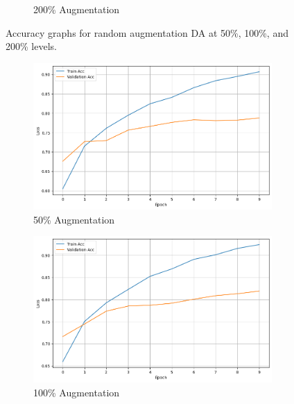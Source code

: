 \documentclass[10pt]{extarticle}
\begin{document}
\begin{figure}[ht]
\begin{subfigure}[b]{0.3\textwidth}
    \caption{200\% Augmentation}
    \label{fig:random_200}
  \end{subfigure}
  \caption{Accuracy graphs for random augmentation DA at 50\%, 100\%, and 200\% levels.}
  \label{fig:random_extreme_substitution_acc}
\end{figure}

\begin{figure}[ht]
  \centering
  \begin{subfigure}[b]{0.3\textwidth}
    \includegraphics[width=\textwidth]{img/synonym_50.png}
    \caption{50\% Augmentation}
    \label{fig:synonym_50}
  \end{subfigure}
  \hfill
  \begin{subfigure}[b]{0.3\textwidth}
    \includegraphics[width=\textwidth]{img/synonym_100.png}
    \caption{100\% Augmentation}
    \label{fig:synonym_100}
  \end{subfigure}
  \hfill
  \begin{subfigure}[b]{0.3\textwidth}

\end{subfigure}
\end{figure}
\end{document}
